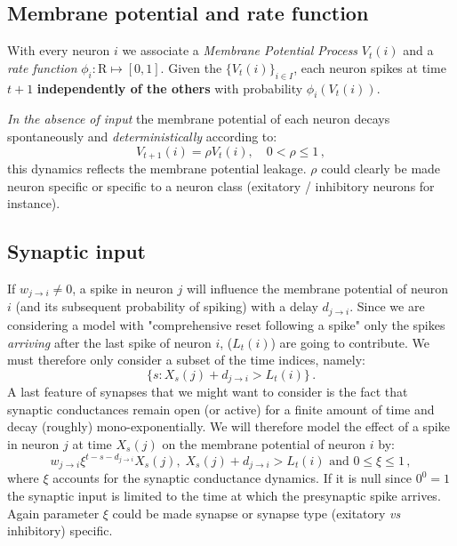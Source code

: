 \documentclass[11pt]{scrartcl}
\begin{document}
\subsection{Membrane potential and rate function}
\label{sec:orgbddb1e4}

With every neuron \(i\) we associate a \emph{Membrane Potential Process} \(V_t(i)\) and a \emph{rate function} \(\phi_i: \mathrm{R} \mapsto [0,1]\). Given the \(\{V_t(i)\}_{i \in I}\), each neuron spikes at time \(t+1\) \textbf{independently of the others} with probability \(\phi_i\left(V_t(i)\right)\). 

\emph{In the absence of input} the membrane potential of each neuron decays spontaneously and \emph{deterministically} according to:
\begin{equation}\label{eq:leakage}
V_{t+1}(i) = \rho V_{t}(i), \quad 0 < \rho \le 1\, , 
\end{equation}  
this dynamics reflects the membrane potential leakage. \(\rho\) could clearly be made neuron specific or specific to a neuron class (exitatory / inhibitory neurons for instance).

\subsection{Synaptic input}
\label{sec:orgb302461}

If \(w_{j\rightarrow i} \neq 0\), a spike in neuron \(j\) will influence the membrane potential of neuron \(i\) (and its subsequent probability of spiking) with a delay \(d_{j\rightarrow i}\). Since we are considering a model with "comprehensive reset following a spike" only the spikes \emph{arriving} after the last spike of neuron \(i\), (\(L_t (i)\)) are going to contribute. We must therefore only consider a subset of the time indices, namely: $$\{s: X_s(j)+d_{j\rightarrow i} > L_t (i)\}\,.$$
A last feature of synapses that we might want to consider is the fact that synaptic conductances remain open (or active) for a finite amount of time and decay (roughly) mono-exponentially. We will therefore model the effect of a spike in neuron \(j\) at time \(X_s(j)\) on the membrane potential of neuron \(i\) by:
\begin{equation}\label{eq:single-input-effect}
w_{j\rightarrow i} \xi^{t-s-d_{j\rightarrow i}} X_s(j), \; X_s(j)+d_{j\rightarrow i} > L_t (i) \text{ and } 0 \le \xi \le 1\, ,
\end{equation}
where \(\xi\) accounts for the synaptic conductance dynamics. If it is null since \(0^0=1\) the synaptic input is limited to the time at which the presynaptic spike arrives. Again parameter \(\xi\) could be made synapse or synapse type (exitatory \emph{vs} inhibitory) specific.
\end{document}
